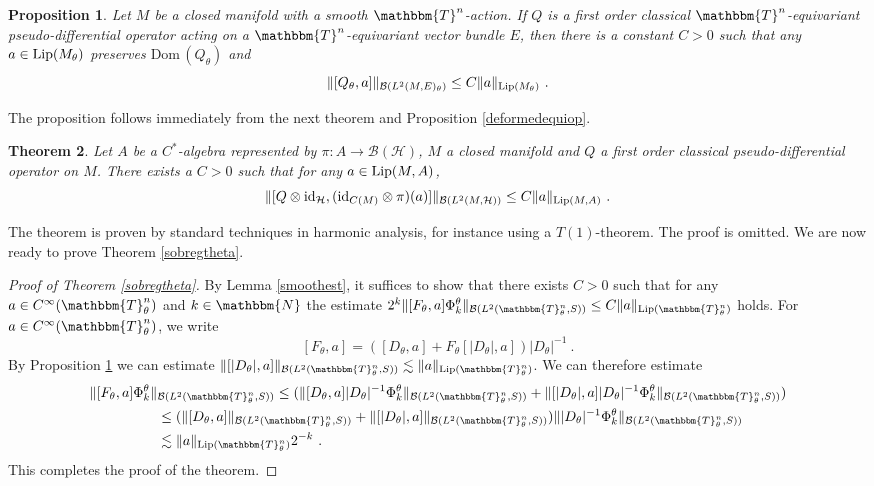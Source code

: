 \documentclass[10pt]{amsart}
\newtheorem{thm}{Theorem}[section]
\newtheorem{prop}[thm]{Proposition}
\theoremstyle{remark}
\theoremstyle{definition}
\begin{document}
\begin{prop}
\label{lipestim}
Let $M$ be a closed manifold with a smooth ${\mathbbm{T}}^n$-action. If $Q$ is a first order classical ${\mathbbm{T}}^n$-equivariant pseudo-differential operator acting on a ${\mathbbm{T}}^n$-equivariant vector bundle $E$, then there is a constant $C>0$ such that any $a\in {\textnormal{Lip}}(M_\theta)$ preserves ${\mathrm{Dom}\,}(Q_\theta)$ and 
$$\|[Q_\theta,a]\|_{{\mathcal{B}}(L^2(M,E)_\theta)}\leq C\|a\|_{{\textnormal{Lip}}(M_\theta)}\ .$$
\end{prop}

The proposition follows immediately from the next theorem and Proposition \ref{deformedequiop}. 

\begin{thm}
Let $A$ be a $C^*$-algebra represented by $\pi:A\to {\mathcal{B}}({\mathcal{H}})$, $M$ a closed manifold and $Q$ a first order classical pseudo-differential operator on $M$. There exists a $C>0$ such that for any $a\in {\textnormal{Lip}}(M,A)$, 
$$\|[Q\otimes { \mathrm{id}}_{\mathcal{H}},({ \mathrm{id}}_{C(M)}\otimes \pi)(a)]\|_{{\mathcal{B}}(L^2(M,{\mathcal{H}}))}\leq C\|a\|_{{\textnormal{Lip}}(M,A)}\ .$$
\end{thm}

The theorem is proven by standard techniques in harmonic analysis, for instance using a $T(1)$-theorem. The proof is omitted. We are now ready to prove Theorem \ref{sobregtheta}.

\begin{proof}[Proof of Theorem \ref{sobregtheta}]
By Lemma \ref{smoothest}, it suffices to show that there exists $C>0$ such that for any $a\in C^\infty({\mathbbm{T}}^n_\theta)$ and $k\in {\mathbbm{N}}$ the estimate $2^{k}\|[F_\theta,a]\Phi_k^\theta\|_{{\mathcal{B}}(L^2({\mathbbm{T}}^n_\theta,S))}\leq C\|a\|_{{\textnormal{Lip}}({\mathbbm{T}}^n_\theta)}$ holds. For $a\in C^\infty({\mathbbm{T}}^n_\theta)$, we write 
$$[F_\theta,a]=([D_\theta,a]+F_\theta[|D_\theta|,a])|D_\theta|^{-1}\ .$$
By Proposition \ref{lipestim} we can estimate $\|[|D_\theta|,a]\|_{{\mathcal{B}}(L^2({\mathbbm{T}}^n_\theta,S))}\lesssim \|a\|_{{\textnormal{Lip}}({\mathbbm{T}}^n_\theta)}$. We can therefore estimate 
\begin{align*}
\|[F_\theta,a]\Phi_k^\theta\|&_{{\mathcal{B}}(L^2({\mathbbm{T}}^n_\theta,S))}\leq (\|[D_\theta,a]|D_\theta|^{-1}\Phi_k^\theta\|_{{\mathcal{B}}(L^2({\mathbbm{T}}^n_\theta,S))}+\|[|D_\theta|,a]|D_\theta|^{-1}\Phi_k^\theta\|_{{\mathcal{B}}(L^2({\mathbbm{T}}^n_\theta,S))})\\
&\leq (\|[D_\theta,a]\|_{{\mathcal{B}}(L^2({\mathbbm{T}}^n_\theta,S))}+\|[|D_\theta|,a]\|_{{\mathcal{B}}(L^2({\mathbbm{T}}^n_\theta,S))})\||D_\theta|^{-1}\Phi_k^\theta\|_{{\mathcal{B}}(L^2({\mathbbm{T}}^n_\theta,S))}\\
&\lesssim \|a\|_{{\textnormal{Lip}}({\mathbbm{T}}^n_\theta)}2^{-k}\ .
\end{align*}
This completes the proof of the theorem.
\end{proof}
\end{document}
